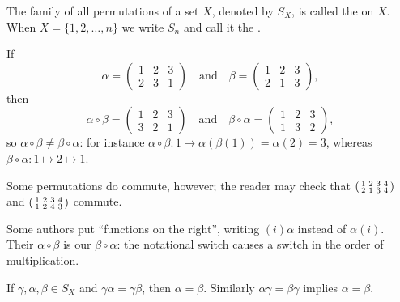 \begin{definition}
	The family of all permutations of a set \(X\), denoted by \(S_X\), is called the
	 on \(X\). When \(X = \{1, 2, \dots, n\}\) we write \(S_n\) and
	call it the .
\end{definition}

\begin{eg}
	If
	\[
		\alpha = \begin{pmatrix} 1 & 2 & 3 \\ 2 & 3 & 1 \end{pmatrix}
		\quad\text{and}\quad
		\beta  = \begin{pmatrix} 1 & 2 & 3 \\ 2 & 1 & 3 \end{pmatrix},
	\]
	then
	\[
		\alpha \circ \beta = \begin{pmatrix} 1 & 2 & 3 \\ 3 & 2 & 1 \end{pmatrix}
		\quad\text{and}\quad
		\beta \circ \alpha = \begin{pmatrix} 1 & 2 & 3 \\ 1 & 3 & 2 \end{pmatrix},
	\]
	so \(\alpha \circ \beta \neq \beta \circ \alpha\): for instance
	\(\alpha\circ\beta\colon 1 \mapsto \alpha(\beta(1)) = \alpha(2) = 3\), whereas
	\(\beta\circ\alpha\colon 1 \mapsto 2 \mapsto 1\).

	Some permutations do commute, however; the reader may check that
	\(\begin{psmallmatrix} 1&2&3&4 \\ 2&1&3&4\end{psmallmatrix}\) and
	\(\begin{psmallmatrix} 1&2&3&4 \\ 1&2&4&3\end{psmallmatrix}\) commute.
\end{eg}

\begin{note}
	Some authors put ``functions on the right'', writing \((i)\alpha\) instead of
	\(\alpha(i)\). Their \(\alpha \circ \beta\) is our \(\beta \circ \alpha\): the
	notational switch causes a switch in the order of multiplication.
\end{note}

\begin{proposition}[Cancellation in \(S_X\)]\label{prop:cancel-SX}
	If \(\gamma, \alpha, \beta \in S_X\) and \(\gamma\alpha = \gamma\beta\), then
	\(\alpha = \beta\). Similarly \(\alpha\gamma = \beta\gamma\) implies \(\alpha = \beta\).
\end{proposition}

